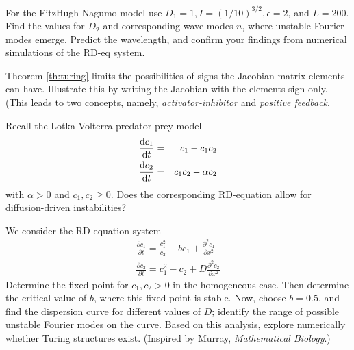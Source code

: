 \begin{exerciseregion}
	\begin{exercise}
		For the FitzHugh-Nagumo model use $D_1=1, I=(1/10)^{3/2}, \epsilon=2$, and $L=200$. 
		Find the values for $D_2$ and corresponding wave modes $n$, where unstable Fourier modes emerge. 
		Predict the wavelength, and confirm your findings from numerical simulations of the RD-eq system.
	\end{exercise}
	\begin{exercise}
		Theorem \ref{th:turing} limits the possibilities of signs the Jacobian matrix elements can have. Illustrate 
		this by writing the Jacobian with the elements sign only. (This leads to two concepts, namely, 
		\emph{activator-inhibitor} and \emph{positive feedback}. 
	\end{exercise}
	\begin{exercise}
		Recall the Lotka-Volterra predator-prey model 
		\begin{eqnarray}
			\frac{\mathrm{d} c_1}{\mathrm{d} t} &=& c_1 - c_1c_2 \nonumber \\
			\frac{\mathrm{d} c_2}{\mathrm{d} t} &=& c_1c_2 - \alpha c_2
		\end{eqnarray}
		with $\alpha>0$ and $c_1,c_2 \geq 0$. 
		Does the corresponding RD-equation allow for diffusion-driven instabilities?
	\end{exercise}
	\begin{exercise}
		We consider the RD-equation system
		\begin{eqnarray}
			\frac{\partial c_1}{\partial t} = \frac{c_1^2}{c_2} - b c_1 + \frac{\partial^2 c_1}{\partial x^2} \\
			\frac{\partial c_2}{\partial t} = c_1^2 - c_2 + D \frac{\partial^2 c_2}{\partial x^2}
		\end{eqnarray}
		Determine the fixed point for $c_1, c_2 > 0$ in the homogeneous case. 
		Then determine the critical value of $b$, where this fixed point is stable. 
		Now, choose $b=0.5$, and find the dispersion curve for different values of $D$; identify the range of 
		possible unstable Fourier modes on the curve. Based on this analysis, explore numerically 
		whether Turing structures exist. (Inspired by Murray, \textit{Mathematical Biology}.) 
	\end{exercise}
	
\end{exerciseregion}





